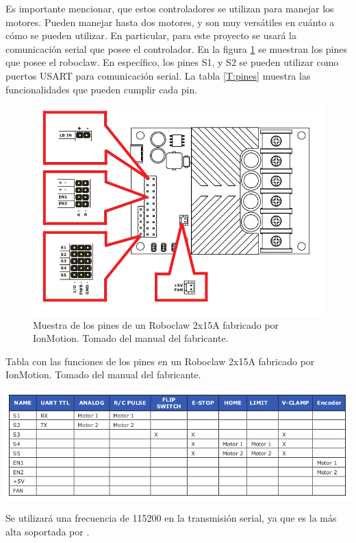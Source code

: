 Es importante mencionar, que estos controladores se utilizan para manejar los motores. Pueden manejar hasta dos motores, y son muy versátiles en cuánto a cómo se pueden utilizar. En particular, para este proyecto se usará la comunicación serial que posee el controlador. En la figura \ref{F:roboclaw} se muestran los pines que posee el roboclaw. En específico, los pines S1, y S2 se pueden utilizar como puertos USART para comunicación serial. La tabla \ref{T:pines} muestra las funcionalidades que pueden cumplir cada pin.

\begin{figure}[H]
\centering
\includegraphics[scale=0.5]{imagenes/roboclaw.png}
\caption{Muestra de los pines de un Roboclaw 2x15A fabricado por IonMotion. Tomado del manual del fabricante.}
\label{F:roboclaw}
\end{figure}

\begin{table}[H]
\centering
\caption{Tabla con las funciones de los pines en un Roboclaw 2x15A fabricado por IonMotion. Tomado del manual del fabricante.}
\includegraphics[scale=0.7]{imagenes/pines.png}
\label{T:pines}
\end{table}

Se utilizará una frecuencia de 115200 en la transmisión serial, ya que es la más alta soportada por .


